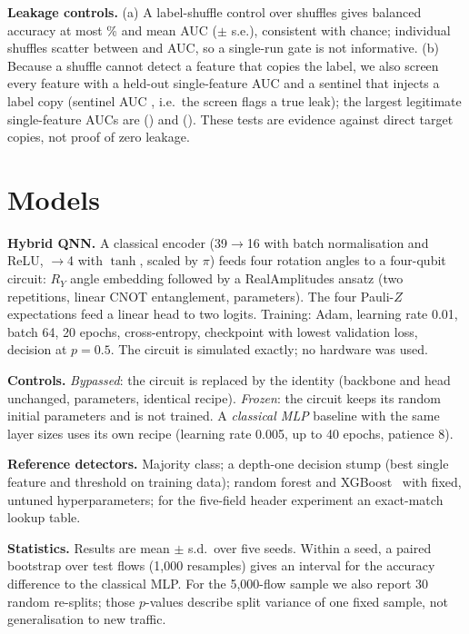 \IfFileExists{IEEEtran.cls}{\documentclass[conference]{IEEEtran}}{\documentclass[10pt,twocolumn]{article}\usepackage[margin=0.8in]{geometry}}
\begin{document}
\textbf{Leakage controls.} (a) A label-shuffle control over \shuffleN{} shuffles gives balanced accuracy at most \shuffleBal\% and mean AUC \shuffleAuc{} ($\pm$\shuffleAucSe{} s.e.), consistent with chance; individual shuffles scatter between \shuffleAucLo{} and \shuffleAucHi{} AUC, so a single-run gate is not informative. (b) Because a shuffle cannot detect a feature that copies the label, we also screen every feature with a held-out single-feature AUC and a sentinel that injects a label copy (sentinel AUC \sentinelAuc{}, i.e.\ the screen flags a true leak); the largest legitimate single-feature AUCs are \topFeatOne{} (\topFeatOneAuc) and \texttt{\topFeatTwo} (\topFeatTwoAuc). These tests are evidence against direct target copies, not proof of zero leakage.

\section{Models}
\textbf{Hybrid QNN.} A classical encoder (39$\to$16 with batch normalisation and ReLU, $\to$4 with $\tanh$, scaled by $\pi$) feeds four rotation angles to a four-qubit circuit: $R_Y$ angle embedding followed by a RealAmplitudes ansatz (two repetitions, linear CNOT entanglement, \paramsVqc{} parameters). The four Pauli-$Z$ expectations feed a linear head to two logits. Training: Adam, learning rate 0.01, batch 64, 20 epochs, cross-entropy, checkpoint with lowest validation loss, decision at $p=0.5$. The circuit is simulated exactly; no hardware was used.

\textbf{Controls.} \emph{Bypassed}: the circuit is replaced by the identity (backbone and head unchanged, \paramsMlp{} parameters, identical recipe). \emph{Frozen}: the circuit keeps its random initial parameters and is not trained. A \emph{classical MLP} baseline with the same layer sizes uses its own recipe (learning rate 0.005, up to 40 epochs, patience 8).

\textbf{Reference detectors.} Majority class; a depth-one decision stump (best single feature and threshold on training data); random forest and XGBoost~\cite{chen2016xgboost} with fixed, untuned hyperparameters; for the five-field header experiment an exact-match lookup table.

\textbf{Statistics.} Results are mean $\pm$ s.d.\ over five seeds. Within a seed, a paired bootstrap over test flows (1{,}000 resamples) gives an interval for the accuracy difference to the classical MLP. For the 5{,}000-flow sample we also report 30 random re-splits; those $p$-values describe split variance of one fixed sample, not generalisation to new traffic.
\end{document}
